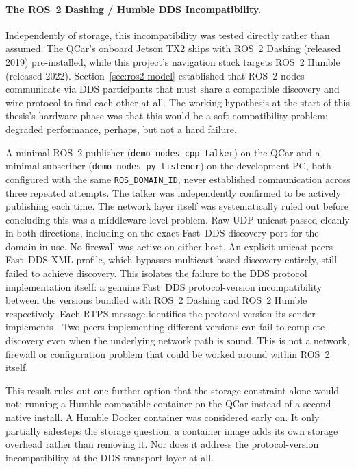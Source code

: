 \paragraph{The ROS~2 Dashing / Humble DDS Incompatibility.}
Independently of storage, this incompatibility was tested directly
rather than assumed. The QCar's onboard Jetson TX2 ships with ROS~2
Dashing (released 2019) pre-installed, while this project's
navigation stack targets ROS~2 Humble (released 2022). Section~\ref{sec:ros2-model}
established that ROS~2 nodes communicate via DDS participants that
must share a compatible discovery and wire protocol to find each
other at all. The working hypothesis at the start of this thesis's
hardware phase was that this would be a soft compatibility problem:
degraded performance, perhaps, but not a hard failure.

A minimal ROS~2 publisher (\texttt{demo\_nodes\_cpp talker}) on the
QCar and a minimal subscriber (\texttt{demo\_nodes\_py listener}) on
the development PC, both configured with the same
\texttt{ROS\_DOMAIN\_ID}, never established communication across
three repeated attempts. The talker was independently confirmed to
be actively publishing each time. The network layer itself was
systematically ruled out before concluding this was a
middleware-level problem. Raw UDP unicast passed cleanly in both
directions, including on the exact Fast~DDS discovery port for the
domain in use. No firewall was active on either host. An
explicit unicast-peers Fast~DDS XML profile, which bypasses
multicast-based discovery entirely, still failed to achieve
discovery. This isolates the failure to the DDS protocol
implementation itself: a genuine Fast~DDS protocol-version
incompatibility between the versions bundled with ROS~2 Dashing and
ROS~2 Humble respectively. Each RTPS message identifies the protocol
version its sender implements \cite{omg2014rtps}. Two peers
implementing different versions can fail to complete discovery even
when the underlying network path is sound. This is not a network,
firewall or configuration problem that could be worked around
within ROS~2 itself.

This result rules out one further option that the storage constraint
alone would not: running a Humble-compatible container on the QCar
instead of a second native install. A Humble Docker container was
considered early on. It only partially sidesteps the storage
question: a container image adds its own storage overhead rather
than removing it. Nor does it address the protocol-version
incompatibility at the DDS transport layer at all.

